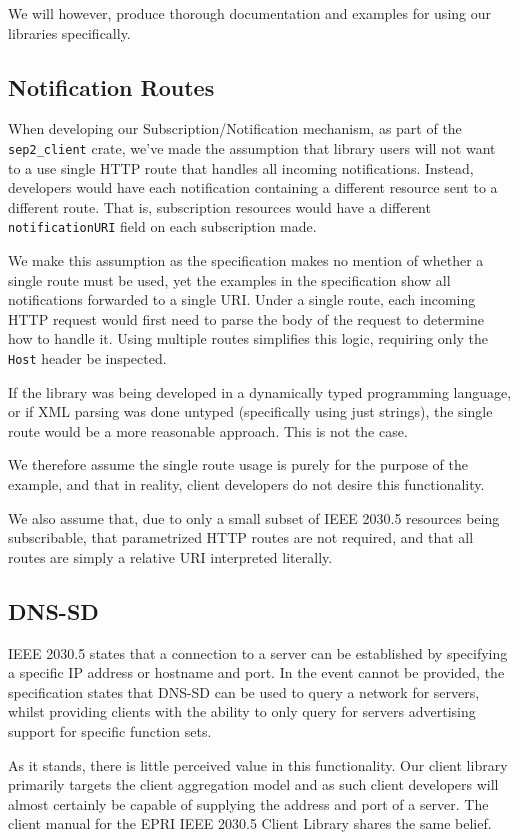 We will however, produce thorough documentation and examples for using our libraries specifically.

\subsection{Notification Routes}
When developing our Subscription/Notification mechanism, as part of the \texttt{sep2\_client} crate, we've made the assumption that library users will not want to a use single HTTP route that handles all incoming notifications. Instead, developers would have each notification containing a different resource sent to a different route. That is, subscription resources would have a different \texttt{notificationURI} field on each subscription made.

We make this assumption as the specification makes no mention of whether a single route must be used, yet the examples in the specification show all notifications forwarded to a single URI. Under a single route, each incoming HTTP request would first need to parse the body of the request to determine how to handle it. Using multiple routes simplifies this logic, requiring only the \texttt{Host} header be inspected. 

If the library was being developed in a dynamically typed programming language, or if XML parsing was done untyped (specifically using just strings), the single route would be a more reasonable approach. This is not the case.

We therefore assume the single route usage is purely for the purpose of the example, and that in reality, client developers do not desire this functionality.

We also assume that, due to only a small subset of IEEE 2030.5 resources being subscribable, that parametrized HTTP routes are not required, and that all routes are simply a relative URI interpreted literally.

\subsection{DNS-SD}
IEEE 2030.5 states that a connection to a server can be established by specifying a specific IP address or hostname and port. In the event cannot be provided, the specification states that DNS-SD can be used to query a network for servers, whilst providing clients with the ability to only query for servers advertising support for specific function sets. 

As it stands, there is little perceived value in this functionality. Our client library primarily targets the client aggregation model and as such client developers will almost certainly be capable of supplying the address and port of a server.
The client manual for the EPRI IEEE 2030.5 Client Library shares the same belief. \cite{eprimanual}

